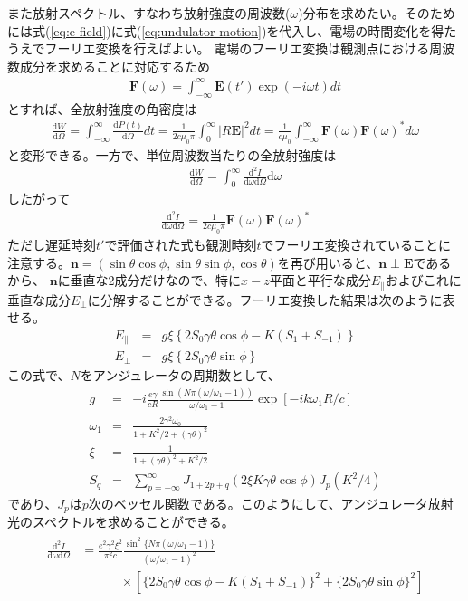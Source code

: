 \documentclass[a4paper,11pt,uplatex]{jsbook}
\begin{document}
また放射スペクトル、すなわち放射強度の周波数($\omega$)分布を求めたい。そのためには式(\ref{eq:e field})に式(\ref{eq:undulator motion})を代入し、電場の時間変化を得たうえでフーリエ変換を行えばよい。
電場のフーリエ変換は観測点における周波数成分を求めることに対応するため
\begin{eqnarray}
  \bm{F}(\omega) = \int_{-\infty}^{\infty} \bm{E}(t')\exp(-i\omega t)dt
\end{eqnarray}
とすれば、全放射強度の角密度は
\begin{eqnarray}
  \frac{\text{d}W}{\text{d}\Omega} = \int_{-\infty}^{\infty} \frac{\text{d}P(t)}{\text{d}\Omega}dt = \frac{1}{2c\mu_0\pi}\int_{0}^{\infty} \left|R\bm{E}\right|^2 dt 
  = \frac{1}{c\mu_0}\int_{-\infty}^{\infty} \bm{F}(\omega)\bm{F}(\omega)^*d\omega
\end{eqnarray}
と変形できる。一方で、単位周波数当たりの全放射強度は
\begin{eqnarray}
  \frac{\text{d}W}{\text{d}\Omega} = \int_{0}^{\infty}\frac{\text{d}^2I}{\text{d}\omega \text{d}\Omega}\text{d}\omega
\end{eqnarray}
したがって
\begin{eqnarray}
  \frac{\text{d}^2I}{\text{d}\omega \text{d}\Omega} = \frac{1}{2c\mu_0\pi}\bm{F}(\omega)\bm{F}(\omega)^*
\end{eqnarray}
ただし遅延時刻$t'$で評価された式も観測時刻$t$でフーリエ変換されていることに注意する。$\bm{n} =(\sin\theta\cos\phi,\sin\theta\sin\phi,\cos\theta)$を再び用いると、$\bm{n}\perp\bm{E}$であるから、
$\bm{n}$に垂直な2成分だけなので、特に$x-z$平面と平行な成分$E_{\parallel}$およびこれに垂直な成分$E_{\perp}$に分解することができる。フーリエ変換した結果は次のように表せる\cite{大柳}。
\begin{eqnarray}
  E_\parallel &=& g\xi\left\{2S_0\gamma \theta \cos\phi - K (S_1 + S_{-1})\right\}\\
  E_\perp &=& g\xi\left\{2S_0\gamma \theta \sin \phi\right\}
\end{eqnarray}
この式で、$N$をアンジュレータの周期数として、
\begin{eqnarray}
  g &=& -i \frac{e\gamma}{cR} \frac{\sin \left( N\pi (\omega/\omega_1 -1) \right)}{\omega/\omega_1 -1}\exp\left[-ik\omega_1 R/c \right]\\
  \omega_1 &=& \frac{2\gamma^2\omega_0}{1+K^2/2 + (\gamma\theta)^2} \label{resonance_wl}\\
  \xi &=& \frac{1}{1 + (\gamma\theta)^2 + K^2/2} \\
  S_q &=& \sum_{p = -\infty}^{\infty} J_{1+2p+q}(2\xi K\gamma\theta\cos\phi)J_p(K^2/4)
\end{eqnarray}
であり、$J_p$は$p$次のベッセル関数である。このようにして、アンジュレータ放射光のスペクトルを求めることができる。
\begin{eqnarray}\label{eq:spectrum}
  \begin{split}
   \frac{\text{d}^2I}{\text{d}\omega \text{d}\Omega} &= \frac{e^2\gamma^2\xi^2}{\pi^2 c}\frac{\sin^2 \{N\pi(\omega/\omega_1 -1)\}}{(\omega/\omega_1 -1)^2}\\
   &~~~~~~~~~~~~~~\times\left[ \{2S_0\gamma\theta\cos\phi - K(S_1 + S_{-1})\}^2 + \{2S_0\gamma \theta \sin \phi\}^2 \right]
  \end{split}
\end{eqnarray}
\end{document}

